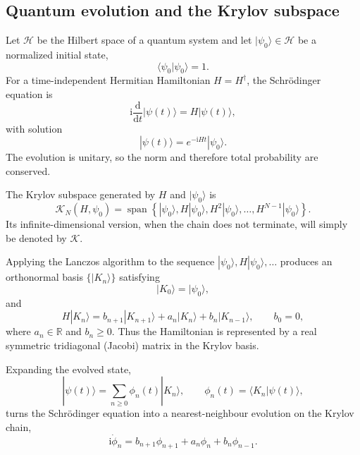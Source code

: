 \documentclass[11pt,a4paper]{article}
\theoremstyle{plain}
\theoremstyle{definition}
\theoremstyle{remark}
\newcommand{\Krylov}{\mathcal K}
\newcommand{\ii}{\mathrm i}
\begin{document}
\subsection{Quantum evolution and the Krylov subspace}

Let $\mathcal H$ be the Hilbert space of a quantum system and let
$|\psi_0\rangle\in\mathcal H$ be a normalized initial state,
\begin{equation*}
\langle\psi_0|\psi_0\rangle=1.
\end{equation*}
For a time-independent Hermitian Hamiltonian $H=H^\dagger$, the Schr\"odinger equation is
\begin{equation*}
\ii\frac{\mathrm d}{\mathrm d t}|\psi(t)\rangle
=
H|\psi(t)\rangle ,
\end{equation*}
with solution
\begin{equation*}
|\psi(t)\rangle=e^{-\ii Ht}|\psi_0\rangle .
\end{equation*}
The evolution is unitary, so the norm and therefore total probability are conserved.

The Krylov subspace generated by $H$ and $|\psi_0\rangle$ is
\begin{equation*}
\Krylov_N(H,\psi_0)
=
\operatorname{span}
\left\{
|\psi_0\rangle,
H|\psi_0\rangle,
H^2|\psi_0\rangle,\ldots,
H^{N-1}|\psi_0\rangle
\right\}.
\end{equation*}
Its infinite-dimensional version, when the chain does not terminate, will simply be denoted by $\Krylov$.

Applying the Lanczos algorithm to the sequence
$|\psi_0\rangle,H|\psi_0\rangle,\ldots$ produces an orthonormal basis
$\{|K_n\rangle\}$ satisfying
\begin{equation*}
|K_0\rangle=|\psi_0\rangle,
\end{equation*}
and
\begin{equation*}
H|K_n\rangle
=
b_{n+1}|K_{n+1}\rangle
+a_n|K_n\rangle
+b_n|K_{n-1}\rangle,
\qquad
b_0=0,
\end{equation*}
where $a_n\in\mathbb R$ and $b_n\geq0$. Thus the Hamiltonian is represented by a real symmetric tridiagonal (Jacobi) matrix in the Krylov basis.

Expanding the evolved state,
\begin{equation*}
|\psi(t)\rangle
=
\sum_{n\geq0}\phi_n(t)|K_n\rangle,
\qquad
\phi_n(t)=\langle K_n|\psi(t)\rangle,
\end{equation*}
turns the Schr\"odinger equation into a nearest-neighbour evolution on the Krylov chain,
\begin{equation*}
\ii\dot\phi_n
=
b_{n+1}\phi_{n+1}
+a_n\phi_n
+b_n\phi_{n-1}.
\end{equation*}
\end{document}

